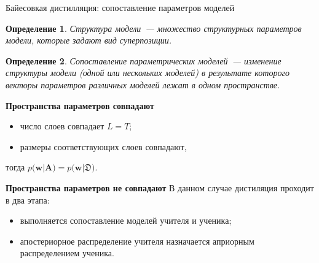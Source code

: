 \documentclass[10pt,pdf,hyperref={unicode}]{beamer}
\newtheorem{rusdefinition}{Определение}
\begin{document}
\begin{frame}{Байесовкая дистилляция: сопоставление параметров моделей}
\begin{rusdefinition}
Структура модели~--- множество структурных параметров модели, которые задают вид суперпозиции.
\end{rusdefinition}

\begin{rusdefinition}
Сопоставление параметрических моделей~--- изменение структуры модели (одной или нескольких моделей) в результате которого векторы параметров различных моделей лежат в одном пространстве.
\end{rusdefinition}


\textbf{Пространства параметров совпадают}
\begin{itemize}
    \item число слоев совпадает $L=T$;
    \item размеры соответствующих слоев совпадают,
\end{itemize}
тогда $p\bigr(\textbf{w}|\textbf{A}\bigr) = p\bigr(\textbf{w}|\mathfrak{D}\bigr)$.

\textbf{Пространства параметров не совпадают}
В данном случае дистиляция проходит в два этапа:
\begin{itemize}
    \item выполняется сопоставление моделей учителя и ученика;
    \item апостериорное распределение учителя назначается априорным распределением ученика.
\end{itemize}

\end{frame}
\end{document}
